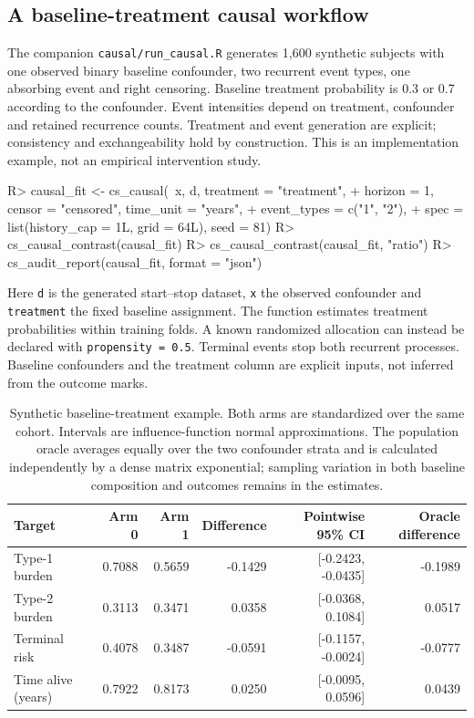 \documentclass[article,nojss]{jss}
\newcommand{\code}[1]{\texttt{#1}}
\newenvironment{CodeChunk}{}{}
\begin{document}
\subsection{A baseline-treatment causal workflow}\label{sec:causal_example}
The companion \code{causal/run\_causal.R} generates 1,600 synthetic subjects with one observed binary baseline confounder, two recurrent event types, one absorbing event and right censoring. Baseline treatment probability is 0.3 or 0.7 according to the confounder. Event intensities depend on treatment, confounder and retained recurrence counts. Treatment and event generation are explicit; consistency and exchangeability hold by construction. This is an implementation example, not an empirical intervention study.
\begin{CodeChunk}
\begin{CodeInput}
R> causal_fit <- cs_causal(~x, d, treatment = "treatment",
+    horizon = 1, censor = "censored", time_unit = "years",
+    event_types = c("1", "2"),
+    spec = list(history_cap = 1L, grid = 64L), seed = 81)
R> cs_causal_contrast(causal_fit)
R> cs_causal_contrast(causal_fit, "ratio")
R> cs_audit_report(causal_fit, format = "json")
\end{CodeInput}
\end{CodeChunk}
Here \code{d} is the generated start--stop dataset, \code{x} the observed confounder and \code{treatment} the fixed baseline assignment. The function estimates treatment probabilities within training folds. A known randomized allocation can instead be declared with \code{propensity = 0.5}. Terminal events stop both recurrent processes. Baseline confounders and the treatment column are explicit inputs, not inferred from the outcome marks.
\begin{table}[tbp]\centering\small
\begin{tabular}{lrrrrr}\toprule
Target & Arm 0 & Arm 1 & Difference & Pointwise 95\% CI & Oracle difference\\\midrule
Type-1 burden & 0.7088 & 0.5659 & -0.1429 & [-0.2423, -0.0435] & -0.1989 \\
Type-2 burden & 0.3113 & 0.3471 & 0.0358 & [-0.0368, 0.1084] & 0.0517 \\
Terminal risk & 0.4078 & 0.3487 & -0.0591 & [-0.1157, -0.0024] & -0.0777 \\
Time alive (years) & 0.7922 & 0.8173 & 0.0250 & [-0.0095, 0.0596] & 0.0439 \\
\bottomrule\end{tabular}
\caption{Synthetic baseline-treatment example. Both arms are standardized over the same cohort. Intervals are influence-function normal approximations. The population oracle averages equally over the two confounder strata and is calculated independently by a dense matrix exponential; sampling variation in both baseline composition and outcomes remains in the estimates.}\label{tab:causal}
\end{table}
\end{document}

